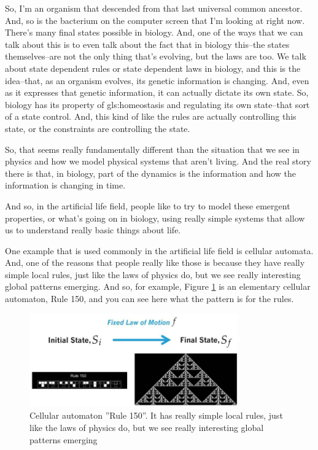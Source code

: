 \documentclass[]{article}
\begin{document}
So, I'm an organism that descended from that last universal common ancestor.
And, so is the bacterium on the computer screen that I'm looking at right now.
There's many final states possible in biology.
And, one of the ways that we can talk about this is to even talk about the fact that in biology this--the states themselves--are not the only thing that's evolving, but the laws are too.
We talk about state dependent rules or state dependent laws in biology, and this is the idea--that, as an organism evolves, its genetic information is changing.
And, even as it expresses that genetic information, it can actually dictate its own state.
So, biology has its property of \gls{gls:homeostasis} and regulating its own state--that sort of a state control.
And, this kind of like the rules are actually controlling this state, or the constraints are controlling the state.

So, that seems really fundamentally different than the situation that we see in physics
and how we model physical systems that aren't living.
And the real story there is that, in biology, part of the dynamics is the information and how the information is changing in time.

And so, in the artificial life field, people like to try to model these emergent properties, or what's going on in biology, using really simple systems that allow us to understand really basic things about life.

One example that is used commonly in the artificial life field is cellular automata.
And, one of the reasons that people really like those is because they have really simple local rules, just like the laws of physics do, but we see really interesting global patterns emerging.
And so, for example, Figure \ref{fig:cellularAutomatonRule150} is an elementary cellular automaton, Rule 150, and you can see here what the pattern is for the rules.

\begin{figure}[H]
	\caption[Cellular automaton ''Rule 150'']{Cellular automaton ''Rule 150''.  It has 	really simple local rules, just like the laws of physics do, but we see really interesting global patterns emerging}\label{fig:cellularAutomatonRule150}
	\includegraphics[width=0.8\textwidth]{cellularAutomatonRule150}
\end{figure}
\end{document}
